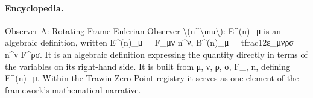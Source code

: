 \paragraph{Encyclopedia.}
Observer A: Rotating-Frame Eulerian Observer \textbackslash{}(n\textasciicircum{}\textbackslash{}mu\textbackslash{}): E\textasciicircum{}(n)\_μ is an algebraic definition, written E\textasciicircum{}(n)\_μ = F\_μν n\textasciicircum{}ν, B\textasciicircum{}(n)\_μ = tfrac12ε\_μνρσ n\textasciicircum{}ν F\textasciicircum{}ρσ. It is an algebraic definition expressing the quantity directly in terms of the variables on its right-hand side. It is built from μ, ν, ρ, σ, F\_, n, defining E\textasciicircum{}(n)\_μ. Within the Trawin Zero Point registry it serves as one element of the framework's mathematical narrative.
